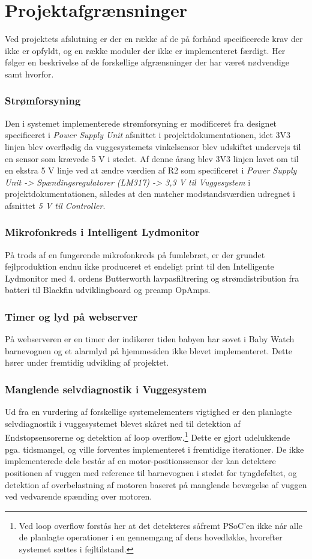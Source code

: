 %
\chapter{Projektafgrænsninger}
\label{projektafgraensninger}
Ved projektets afslutning er der en række af de på forhånd specificerede krav der ikke er opfyldt, og en række moduler der ikke er implementeret færdigt. Her følger en beskrivelse af de forskellige afgrænsninger der har været nødvendige samt hvorfor. 

\subsection{Strømforsyning}
Den i systemet implementerede strømforsyning er modificeret fra designet specificeret i \textit{Power Supply Unit} afsnittet i projektdokumentationen, idet 3V3 linjen blev overflødig da vuggesystemets vinkelsensor blev udskiftet undervejs til en sensor som krævede 5 V i stedet. Af denne årsag blev 3V3 linjen lavet om til en ekstra 5 V linje ved at ændre værdien af R2 som specificeret i \textit{Power Supply Unit -> Spændingsregulatorer (LM317) -> 3,3 V til Vuggesystem} i projektdokumentationen, således at den matcher modstandsværdien udregnet i afsnittet \textit{5 V til Controller}.

\subsection{Mikrofonkreds i Intelligent Lydmonitor}
På trods af en fungerende mikrofonkreds på fumlebræt, er der grundet fejlproduktion endnu ikke produceret et endeligt print til den Intelligente Lydmonitor med 4. ordens Butterworth lavpasfiltrering og strømdistribution fra batteri til Blackfin udviklingboard \citep{EzKit} og preamp OpAmps.

\subsection{Timer og lyd på webserver}
På webserveren er en timer der indikerer tiden babyen har sovet i Baby Watch barnevognen og et alarmlyd på hjemmesiden ikke blevet implementeret. Dette hører under fremtidig udvikling af projektet. 

\subsection{Manglende selvdiagnostik i Vuggesystem}
Ud fra en vurdering af forskellige systemelementers vigtighed er den planlagte selvdiagnostik i vuggesystemet blevet skåret ned til detektion af Endstopsensorerne og detektion af loop overflow.\footnote{Ved loop overflow forstås her at det detekteres såfremt PSoC'en \citep{website:Cypress} ikke når alle de planlagte operationer i en gennemgang af dens hovedløkke, hvorefter systemet sættes i fejltilstand.} Dette er gjort udelukkende pga. tidsmangel, og ville forventes implementeret i fremtidige iterationer. De ikke implementerede dele består af en motor-positionssensor der kan detektere positionen af vuggen med reference til barnevognen i stedet for tyngdefeltet, og detektion af overbelastning af motoren baseret på manglende bevægelse af vuggen ved vedvarende spænding over motoren. 

